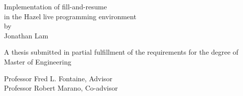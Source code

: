 \thispagestyle{empty}

{
  \centering
  \large

  
  \vfill{}
  
  {
    {
      \huge
      Implementation of fill-and-resume \\
      in the Hazel live programming environment \\
    }
    \vs{}
    by \\
    Jonathan Lam \\
  }

  \vfill{}

  {
    A thesis submitted in partial fulfillment of the requirements for the degree of \\
    Master of Engineering \\
  }

  \vfill{}

  {
    Professor Fred L. Fontaine, Advisor \\
    Professor Robert Marano, Co-advisor \\

  }
}

